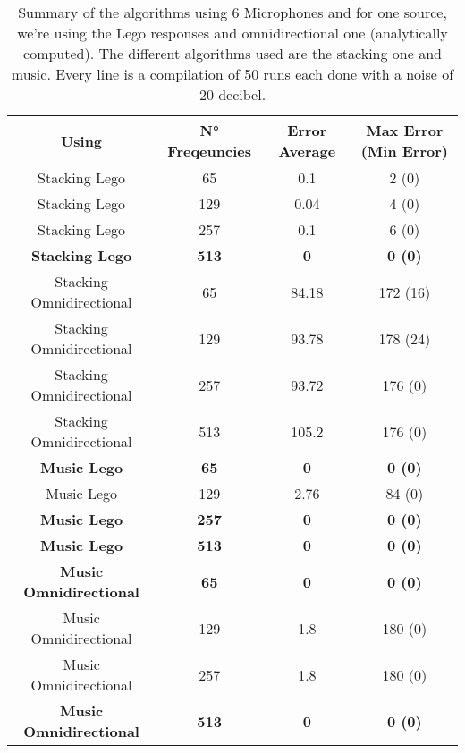 \begin{table}[H]
   \centering
    \begin{tabular}{|c|c|c|c|}
      \hline
      Using & N° Freqeuncies & Error Average & Max Error (Min Error) \\
      \hline
      Stacking Lego & 65 & 0.1 & 2 (0) \\
      Stacking Lego & 129 & 0.04 & 4 (0) \\
      Stacking Lego & 257 & 0.1 & 6 (0) \\
      \textbf{Stacking Lego} & \textbf{513} &\textbf{0} &\textbf{0 (0)} \\
      Stacking Omnidirectional & 65 & 84.18 & 172 (16) \\
      Stacking Omnidirectional & 129 & 93.78 & 178 (24) \\
      Stacking Omnidirectional & 257 & 93.72 & 176 (0) \\
      Stacking Omnidirectional & 513 & 105.2 & 176 (0) \\
      \textbf{Music Lego} & \textbf{65}& \textbf{0}& \textbf{0 (0)}\\
      Music Lego & 129 & 2.76 & 84 (0) \\
      \textbf{Music Lego} & \textbf{257} &\textbf{0} &\textbf{0 (0)} \\
      \textbf{Music Lego} & \textbf{513} &\textbf{0} &\textbf{0 (0)} \\
      \textbf{Music Omnidirectional} & \textbf{65}& \textbf{0} & \textbf{0 (0)}\\
      Music Omnidirectional & 129 & 1.8 & 180 (0) \\
      Music Omnidirectional & 257 & 1.8 & 180 (0) \\
      \textbf{Music Omnidirectional} & \textbf{513} &\textbf{0} &\textbf{0 (0)} \\
      \hline
    \end{tabular}
    \caption{Summary of the algorithms using 6 Microphones and for one source, we're using the Lego responses and omnidirectional one (analytically computed). The different algorithms used are the stacking one and music. Every line is a compilation of 50 runs each done with a noise of 20 decibel.}
    \label{table:6mics1source}
\end{table}

